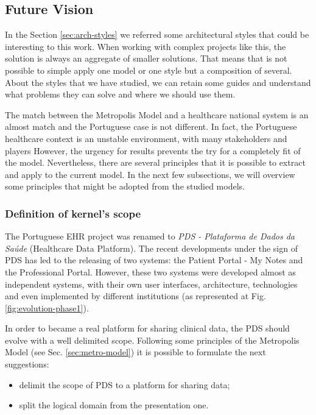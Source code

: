 

\subsection{Future Vision}

In the Section \ref{sec:arch-styles} we referred some architectural styles that could be interesting to this work. When working with complex projects like this, the solution is always an aggregate of smaller solutions. That means that is not possible to simple apply one model or one style but a composition of several. About the styles that we have studied, we can retain some guides and understand what problems they can solve and where we should use them.

The match between the Metropolis Model and a healthcare national system is an almost match and the Portuguese case is not different. In fact, the Portuguese healthcare context is an unstable environment, with many stakeholders and players %
However, the urgency for results prevents the try for a completely fit of the model. Nevertheless, there are several principles that it is possible to extract and apply to the current model. In the next few subsections, we will overview some principles that might be adopted from the studied models.


\subsubsection{Definition of kernel's scope}

The Portuguese EHR project was renamed to \textit{PDS - Plataforma de Dados da Saúde} (Healthcare Data Platform). The recent developments under the sign of PDS has led to the releasing of two systems: the Patient Portal - My Notes and the Professional Portal. However, these two systems were developed almost as independent systems, with their own user interfaces, architecture, technologies and even implemented by different institutions (as represented at Fig. \ref{fig:evolution-phase1}).


In order to became a real platform for sharing clinical data, the PDS should evolve with a well delimited scope. Following some principles of the Metropolis Model (see Sec. \ref{sec:metro-model}) it is possible to formulate the next suggestions:
\begin{itemize}
\item delimit the scope of PDS to a platform for sharing data;
\item split the logical domain from the presentation one.
\end{itemize}

